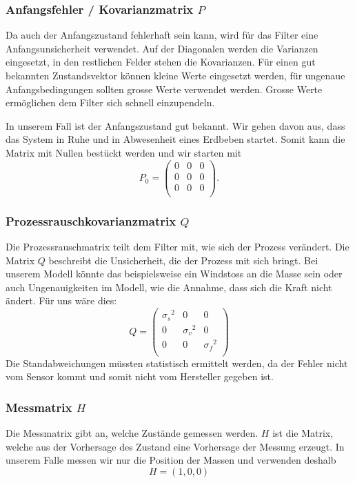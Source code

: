 \subsubsection*{Anfangsfehler / Kovarianzmatrix $P$}
Da auch der Anfangszustand fehlerhaft sein kann, wird für das Filter eine Anfangsunsicherheit verwendet. 
Auf der Diagonalen werden die Varianzen eingesetzt, in den restlichen Felder stehen die Kovarianzen.
Für einen gut bekannten Zustandsvektor können kleine Werte eingesetzt werden, für ungenaue Anfangsbedingungen sollten grosse Werte verwendet werden. 
Grosse Werte ermöglichen dem Filter sich schnell einzupendeln. 

In unserem Fall ist der Anfangszustand gut bekannt. 
Wir gehen davon aus,
dass das System in Ruhe und in Abwesenheit eines Erdbeben startet.
Somit kann die Matrix mit Nullen bestückt werden und wir starten mit
\[ 
{P_0 }=
\left(
\begin{array}{ccc} 	
0 & 0 &0 \\ 
0 &0 & 0 \\ 
0 & 0 &0 \\
\end{array}
\right).
 \] 


\subsubsection*{Prozessrauschkovarianzmatrix $Q$}
Die Prozessrauschmatrix teilt dem Filter mit, wie sich der Prozess verändert. 
Die Matrix $Q$ beschreibt die Unsicherheit, die der Prozess mit sich bringt. 
Bei unserem Modell könnte das beispielsweise ein Windstoss an die Masse sein
oder auch Ungenauigkeiten im Modell, wie die Annahme, dass sich die Kraft nicht ändert.
Für uns wäre dies:
\[ 
Q = \left(
 \begin{array}{ccc} 	
{\sigma_s }^2& 0& 0 \\ 
0 & {\sigma_v }^2& 0\\ 
0 & 0& {\sigma_f }^2\\
\end{array}\right)  
 \]
Die Standabweichungen müssten statistisch ermittelt werden, da der Fehler nicht vom Sensor kommt und somit nicht vom Hersteller gegeben ist. 

\subsubsection*{Messmatrix $H$}
Die Messmatrix gibt an, welche Zustände gemessen werden. 
$H$ ist die Matrix, welche aus der Vorhersage des Zustand eine Vorhersage der Messung erzeugt.
In unserem Falle messen wir nur die Position der Massen und verwenden deshalb
\[ 
H = (1, 0, 0) 
\]

